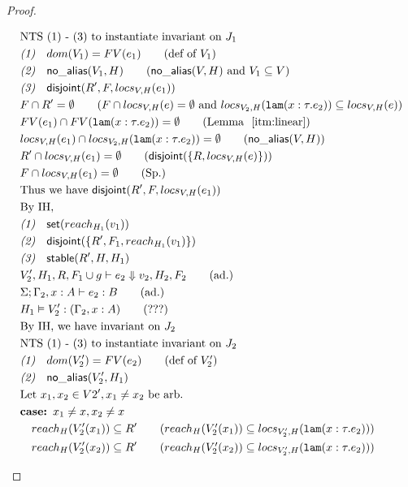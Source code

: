 \documentclass[sigconf]{acmart}
\newcommand{\ms}[1]{\ensuremath{\mathsf{#1}}}
\newcommand{\irl}[1]{\mathtt{#1}}
\newcommand{\na}[1]{\mathsf{no\_alias}(#1)}
\newcommand{\stable}[1]{\mathsf{stable}(#1)}
\newcommand{\dist}[1]{\mathsf{disjoint}(#1)}
\theoremstyle{definition}
\begin{document}
\begin{proof}
\begin{description}
\begin{align*}
  &\text{NTS (1) - (3) to instantiate invariant on } J_1\\
  &\emph{(1)}\quad dom(V_1) = FV(e_1) \tag{def of $V_1$}\\
  &\emph{(2)}\quad \na{V_1,H} \tag{$\na{V,H}$ and $V_1 \subseteq V$}\\
  &\emph{(3)}\quad \dist{R',F,locs_{V,H}(e_1)}\\
  &F \cap R' = \emptyset \tag{$F \cap locs_{V,H}(e) = \emptyset$ and $locs_{V_2,H}(\irl{lam}(x : \tau. e_2)) \subseteq locs_{V,H}(e)$}\\
  &FV(e_1) \cap FV(\irl{lam}(x : \tau. e_2)) = \emptyset \tag{Lemma ~\ref{itm:linear}}\\
  &locs_{V,H}(e_1) \cap locs_{V_2,H}(\irl{lam}(x : \tau. e_2)) = \emptyset \tag{$\na{V,H}$}\\
  &R' \cap locs_{V,H}(e_1) = \emptyset \tag{$\dist{\{R,locs_{V,H}(e)\}}$}\\
  &F \cap locs_{V,H}(e_1) = \emptyset \tag{Sp.}\\
  &\text{Thus we have } \dist{R',F,locs_{V,H}(e_1)}\\
  &\text{By IH, }\\
  &\emph{(1)}\quad \ms{set}(reach_{H_1}(v_1))\\
  &\emph{(2)}\quad \dist{\{R',F_1,reach_{H_1}(v_1)\}}\\
  &\emph{(3)}\quad \stable{R',H,H_1}\\
  &V_2',H_1,R, F_1 \cup g \vdash e_2 \Downarrow v_2,H_2,F_2 \tag{ad.} \\
  &\Sigma; \Gamma_2, x : A \vdash e_2 : B \tag{ad.}\\
  &H_1 \vDash V_2' : (\Gamma_2, x : A) \tag{???}\\
  &\text{By IH, we have invariant on } J_2\\
  &\text{NTS (1) - (3) to instantiate invariant on } J_2\\
  &\emph{(1)}\quad dom(V_2') = FV(e_2) \tag{def of $V_2'$}\\
  &\emph{(2)}\quad \na{V_2',H_1}\\
  &\text{Let } x_1, x_2 \in V2', x_1 \ne x_2 \text{ be arb.}\\
  &\textbf{case: } x_1 \ne x, x_2 \ne x\\
  &\quad reach_H(V_2'(x_1)) \subseteq R' \tag{$reach_H(V_2'(x_1)) \subseteq locs_{V_2',H}(\irl{lam}(x : \tau. e_2))$}\\
  &\quad reach_H(V_2'(x_2)) \subseteq R' \tag{$reach_H(V_2'(x_2)) \subseteq locs_{V_2',H}(\irl{lam}(x : \tau. e_2))$}\\

\end{align*}
\end{description}
\end{proof}
\end{document}
